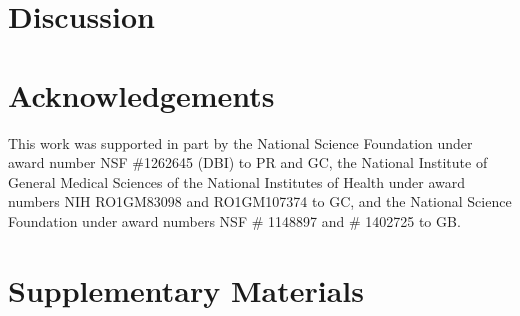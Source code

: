 \documentclass[12pt]{article}
\begin{document}
\section*{Discussion}

\section*{Acknowledgements}

This work was supported in part by 
the National Science Foundation under award number NSF \#1262645 (DBI) to PR and GC, 
the National Institute of General Medical Sciences of the National Institutes of Health under award numbers NIH RO1GM83098 and RO1GM107374 to GC,
and the National Science Foundation under award numbers NSF \# 1148897 and \# 1402725 to GB.


\newpage

%

\newpage

\section*{Supplementary Materials}
\renewcommand{\thefigure}{S\arabic{figure}}
\setcounter{figure}{0}
\renewcommand{\thetable}{S\arabic{table}}
\setcounter{table}{0}
\renewcommand{\theequation}{S\arabic{table}}
\setcounter{equation}{0}
\end{document}
